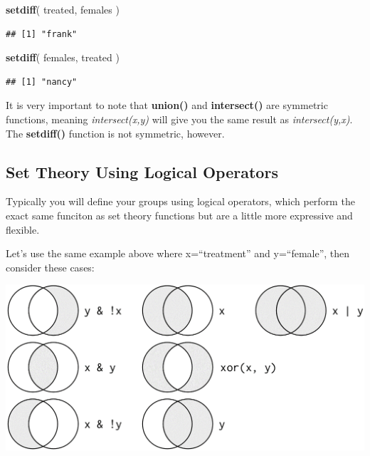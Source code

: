 \documentclass[]{book}
\newenvironment{Shaded}{\begin{snugshade}}{\end{snugshade}}
\newcommand{\KeywordTok}[1]{\textcolor[rgb]{0.13,0.29,0.53}{\textbf{#1}}}
\newcommand{\NormalTok}[1]{#1}
\theoremstyle{definition}
\theoremstyle{definition}
\theoremstyle{definition}
\theoremstyle{remark}
\begin{document}
\begin{Shaded}
\begin{Highlighting}[]
\KeywordTok{setdiff}\NormalTok{( treated, females )}
\end{Highlighting}
\end{Shaded}

\begin{verbatim}
## [1] "frank"
\end{verbatim}

\begin{Shaded}
\begin{Highlighting}[]
\KeywordTok{setdiff}\NormalTok{( females, treated )}
\end{Highlighting}
\end{Shaded}

\begin{verbatim}
## [1] "nancy"
\end{verbatim}

It is very important to note that \textbf{union()} and
\textbf{intersect()} are symmetric functions, meaning
\emph{intersect(x,y)} will give you the same result as
\emph{intersect(y,x)}. The \textbf{setdiff()} function is not symmetric,
however.

\hypertarget{set-theory-using-logical-operators}{%
\subsection{Set Theory Using Logical
Operators}\label{set-theory-using-logical-operators}}

Typically you will define your groups using logical operators, which
perform the exact same funciton as set theory functions but are a little
more expressive and flexible.

Let's use the same example above where x=``treatment'' and y=``female'',
then consider these cases:

\includegraphics{figures/set_theory.png}
\end{document}

